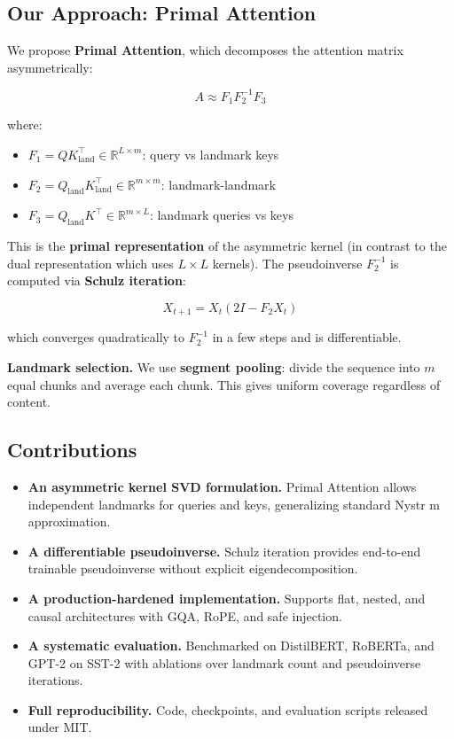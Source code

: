 \subsection{Our Approach: Primal Attention}

We propose \textbf{Primal Attention}, which decomposes the attention matrix 
asymmetrically:

\[
A \approx F_1 F_2^{-1} F_3
\]

where:

\begin{itemize}
\item $F_1 = Q K_\text{land}^\top \in \mathbb{R}^{L \times m}$: query vs landmark keys
\item $F_2 = Q_\text{land} K_\text{land}^\top \in \mathbb{R}^{m \times m}$: landmark-landmark
\item $F_3 = Q_\text{land} K^\top \in \mathbb{R}^{m \times L}$: landmark queries vs keys

\end{itemize}
This is the \textbf{primal representation} of the asymmetric kernel (in contrast 
to the dual representation which uses $L \times L$ kernels). The pseudoinverse 
$F_2^{-1}$ is computed via \textbf{Schulz iteration}:

\[
X_{t+1} = X_t (2I - F_2 X_t)
\]

which converges quadratically to $F_2^{-1}$ in a few steps and is differentiable.

\textbf{Landmark selection.} We use \textbf{segment pooling}: divide the sequence into 
$m$ equal chunks and average each chunk. This gives uniform coverage 
regardless of content.

\subsection{Contributions}

\begin{itemize}
\item \textbf{An asymmetric kernel SVD formulation.} Primal Attention allows independent
  landmarks for queries and keys, generalizing standard Nystr m approximation.
\item \textbf{A differentiable pseudoinverse.} Schulz iteration provides end-to-end
  trainable pseudoinverse without explicit eigendecomposition.
\item \textbf{A production-hardened implementation.} Supports flat, nested, and causal
  architectures with GQA, RoPE, and safe injection.
\item \textbf{A systematic evaluation.} Benchmarked on DistilBERT, RoBERTa, and GPT-2
  on SST-2 with ablations over landmark count and pseudoinverse iterations.
\item \textbf{Full reproducibility.} Code, checkpoints, and evaluation scripts released
  under MIT.

\end{itemize}
